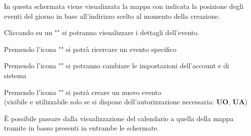 \documentclass{article}
\begin{document}
\begin{description}
\begin{center}
        \end{center}
    \item[] In questa schermata viene visualizzata la mappa con indicata la posizione degli eventi del giorno in base all'indirizzo scelto al momento della creazione.
    \item[] Cliccando su un "" si potranno visualizzare i dettagli dell'evento.
    \item[] Premendo l'icona "" si potrà ricercare un evento specifico
    \item[] Premendo l'icona "" si potranno cambiare le impostazioni dell'account e di sistema
    \item[] Premendo l'icona "" si potrà creare un nuovo evento \\ (visibile e utilizzabile solo se si dispone dell'autorizzazione necessaria: \textbf{UO}, \textbf{UA})
    \item[] È possibile passare dalla visualizzazione del calendario a quella della mappa tramite in basso presenti in entrambe le schermate.
\end{description}
\clearpage
\end{document}
